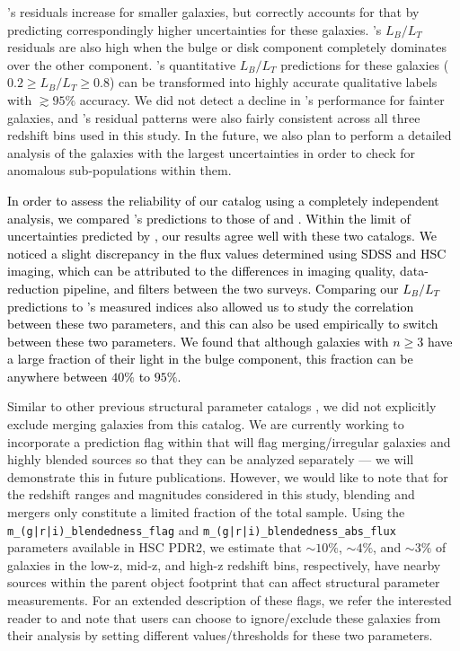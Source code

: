 \gampen{}'s residuals increase for smaller galaxies, but \gampen{} correctly accounts for that by predicting correspondingly higher uncertainties for these galaxies. \gampen{}'s $L_B/L_T$ residuals are also high when the bulge or disk component completely dominates over the other component. \gampen{}'s quantitative $L_B/L_T$ predictions for these galaxies ($0.2 \geq L_B/L_T \geq 0.8$) can be transformed into highly accurate qualitative labels with $\gtrsim95\%$ accuracy. We did not detect a decline in \gampen{}'s performance for fainter galaxies, and \gampen{}'s residual patterns were also fairly consistent across all three redshift bins used in this study. In the future, we also plan to perform a detailed analysis of the galaxies with the largest uncertainties in order to check for anomalous sub-populations within them.

\textcolor{black}{In order to assess the reliability of our catalog using a completely independent analysis, we compared \gampen{}'s predictions to those of \citet{simard_11} and \citet{hsc_mass_size}. Within the limit of uncertainties predicted by \gampen{}, our results agree well with these two catalogs. We noticed a slight discrepancy in the flux values determined using SDSS and HSC imaging, which can be attributed to the differences in imaging quality, data-reduction pipeline, and filters between the two surveys. Comparing our $L_B/L_T$ predictions to \citet{hsc_mass_size}'s measured \sersic{} indices also allowed us to study the correlation between these two parameters, and this can also be used empirically to switch between these two parameters. We found that although galaxies with $n\geq3$ have a large fraction of their light in the bulge component, this fraction can be anywhere between $40\%$ to $95\%$.}

Similar to other previous structural parameter catalogs \citep[e.g.,][]{simard_11,tarsitano_18}, we did not explicitly exclude merging galaxies from this catalog. We are currently working to incorporate a prediction flag within \gampen{} that will flag merging/irregular galaxies and highly blended sources so that they can be analyzed separately --- we will demonstrate this in future publications. However, we would like to note that for the redshift ranges and magnitudes considered in this study, blending and mergers only constitute a limited fraction of the total sample. Using the \texttt{m\_(g|r|i)\_blendedness\_flag} and \texttt{m\_(g|r|i)\_blendedness\_abs\_flux} parameters available in HSC PDR2, we estimate that $\sim10\%$, $\sim4\%$, and $\sim3\%$ of galaxies in the low-z, mid-z, and high-z redshift bins, respectively, have nearby sources within the parent object footprint that can affect structural parameter measurements. For an extended description of these flags, we refer the interested reader to \citet{hsc_pipeline} and note that users can choose to ignore/exclude these galaxies from their analysis by setting different values/thresholds for these two parameters. 

